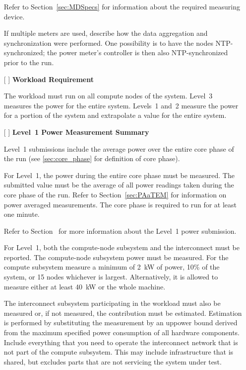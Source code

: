\begin{itemize}
Refer to Section~\ref{sec:MDSpecs} for information about the required measuring device.

If multiple meters are used, describe how the data aggregation and synchronization were performed.
One possibility is to have the nodes NTP-synchronized; the power meter's controller is then also NTP-synchronized prior to the run.

\item[{[ ]}]
\textbf{Workload Requirement}

The workload must run on all compute nodes of the system.
Level~3 measures the power for the entire system.
Levels~1 and~2 measure the power for a portion of the system and extrapolate a value for the entire system.

\item[{[ ]}]
\textbf{Level~1 Power Measurement Summary}

Level~1 submissions include the average power over the entire core phase of the run (see \ref{sec:core_phase} for definition of core phase).

For Level~1, the power during the entire core phase must be measured.
The submitted value must be the average of all power readings taken during the core phase of the run.
Refer to Section~\ref{sec:PAaTEM} for information on power averaged measurements.
The core phase is required to run for at least one minute.

Refer to Section~ for more information about the Level~1 power submission.

For Level~1, both the compute-node subsystem and the interconnect must be reported.
The compute-node subsystem power must be measured.
For the compute subsystem measure a minimum of 2~kW of power, 10\% of the system, or 15 nodes whichever is largest.
Alternatively, it is allowed to measure either at least 40~kW or the whole machine.

The interconnect subsystem participating in the workload must also be measured or, if not measured, the contribution must be estimated.
Estimation is performed by substituting the measurement by an uppower bound derived from the maximum specified power consumption of all hardware components.
Include everything that you need to operate the interconnect network that is not part of the compute subsystem.
This may include infrastructure that is shared, but excludes parts that are not servicing the system under test.


\end{itemize}
